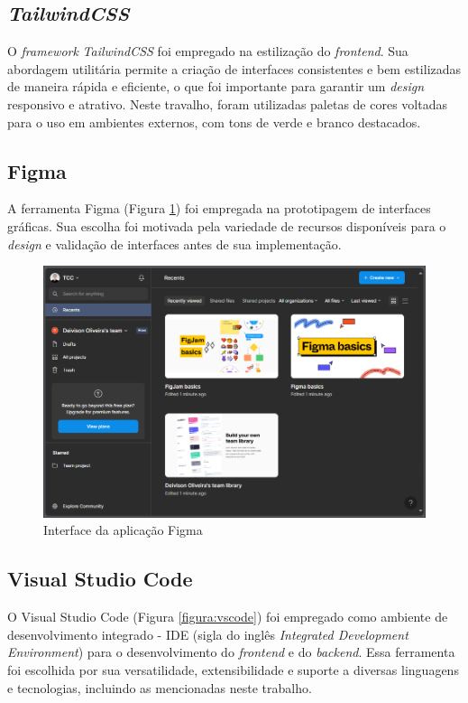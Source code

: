 \subsection{\textit{TailwindCSS}}
O \textit{framework} \textit{TailwindCSS} foi empregado na estilização do \textit{frontend}. Sua abordagem utilitária permite a criação de interfaces consistentes e bem estilizadas de maneira rápida e eficiente, o que foi importante para garantir um \textit{design} responsivo e atrativo. Neste travalho, foram utilizadas paletas de cores voltadas para o uso em ambientes externos, com tons de verde e branco destacados.

\subsection{Figma}
A ferramenta Figma (Figura \ref{figura:figma}) foi empregada na prototipagem de interfaces gráficas. Sua escolha foi motivada pela variedade de recursos disponíveis para o \textit{design} e validação de interfaces antes de sua implementação.

\begin{figure}[!htb] \centering
  \caption{Interface da aplicação Figma} \label{figura:figma}
  \begin{varwidth}{\linewidth}
    \includegraphics[width=16cm]{figuras/figma.png}
  \end{varwidth}
\end{figure}

\subsection{Visual Studio Code}
O Visual Studio Code (Figura \ref{figura:vscode}) foi empregado como ambiente de desenvolvimento integrado - IDE (sigla do inglês \textit{Integrated Development Environment}) para o desenvolvimento do \textit{frontend} e do \textit{backend}. Essa ferramenta foi escolhida por sua versatilidade, extensibilidade e suporte a diversas linguagens e tecnologias, incluindo as mencionadas neste trabalho.

